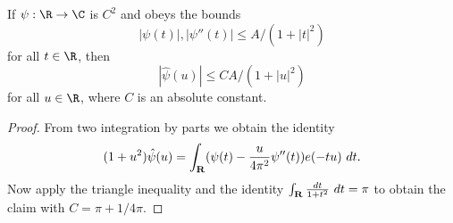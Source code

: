 \begin{lemma}
\label{decay}
\leanok
If $\psi:\R \to \C$ is $C^2$ and obeys the bounds
    $$ |\psi(t)|, |\psi''(t)| \leq A / (1 + |t|^2)$$
    for all $t \in \R$, then
  $$ |\hat \psi(u)| \leq C A / (1+|u|^2)$$
  for all $u \in \R$, where $C$ is an absolute constant.
\end{lemma}
\begin{proof}
\leanok
From two integration by parts we obtain the identity
  $$ (1+u^2) \hat \psi(u) = \int_{\bf R} (\psi(t) - \frac{u}{4\pi^2} \psi''(t)) e(-tu)\ dt.$$
  Now apply the triangle inequality and the identity $\int_{\bf R} \frac{dt}{1+t^2}\ dt = \pi$ to
  obtain the claim with $C = \pi + 1 / 4 \pi$.
\end{proof}
